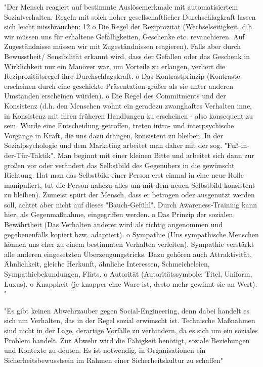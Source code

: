"Der Mensch reagiert auf bestimmte Auslösemerkmale mit automatisiertem Sozialverhalten. Regeln mit solch hoher gesellschaftlicher Durchschlagkraft lassen sich leicht
missbrauchen:
12
o Die Regel der Reziprozität (Wechselseitigkeit, d.h. wir müssen uns für erhaltene Gefälligkeiten, Geschenke etc. revanchieren. Auf Zugeständnisse müssen wir mit Zugeständnissen reagieren). Falls aber durch Bewusstheit/ Sensibilität erkannt wird, dass der Gefallen oder das Geschenk in Wirklichkeit nur
ein Manöver war, um Vorteile zu erlangen, verliert die Reziprozitätsregel ihre
Durchschlagskraft.
o Das Kontrastprinzip (Kontraste erscheinen durch eine geschickte Präsentation
größer als sie unter anderen Umständen erscheinen würden).
o Die Regel des Commitments und der Konsistenz (d.h. den Menschen wohnt
ein geradezu zwanghaftes Verhalten inne, in Konsistenz mit ihren früheren
Handlungen zu erscheinen - also konsequent zu sein. Wurde eine Entscheidung getroffen, treten intra- und interpsychische Vorgänge in Kraft, die uns
dazu drängen, konsistent zu bleiben. In der Sozialpsychologie und dem Marketing arbeitet man daher mit der sog. "Fuß-in-der-Tür-Taktik". Man beginnt
mit einer kleinen Bitte und arbeitet sich dann zur großen vor oder verändert
das Selbstbild des Gegenübers in die gewünscht Richtung. Hat man das
Selbstbild einer Person erst einmal in eine neue Rolle manipuliert, tut die Person nahezu alles um mit dem neuen Selbstbild konsistent zu bleiben). Zumeist spürt der Mensch, dass er betrogen oder ausgenutzt werden soll, achtet
aber nicht auf dieses "Bauch-Gefühl". Durch Awareness-Training kann hier,
als Gegenmaßnahme, eingegriffen werden.
o Das Prinzip der sozialen Bewährtheit (Das Verhalten anderer wird als richtig
angenommen und gegebenenfalls kopiert bzw. adaptiert).
o Sympathie (Uns sympathische Menschen können uns eher zu einem bestimmten Verhalten verleiten). Sympathie verstärkt alle anderen eingesetzten
Überzeugungstricks. Dazu gehören auch Attraktivität, Ähnlichkeit, gleiche
Herkunft, ähnliche Interessen, Schmeicheleien, Sympathiebekundungen, Flirts.
o Autorität (Autoritätssymbole: Titel, Uniform, Luxus).
o Knappheit (je knapper eine Ware ist, desto mehr gewinnt sie an Wert). "\cite{10_bka}

"Es gibt keinen Abwehrzauber gegen Social-Engineering, denn dabei handelt es sich um Verhalten,
das in der Regel sozial erwünscht ist. Technische
Maßnahmen sind nicht in der Lage, derartige Vorfälle zu verhindern, da es
sich um ein soziales Problem handelt. Zur Abwehr wird die Fähigkeit benötigt,
soziale Beziehungen und Kontexte zu deuten. Es ist notwendig, in Organisationen
ein Sicherheitsbewusstsein im Rahmen einer Sicherheitskultur zu schaffen"\cite{10_bka}

